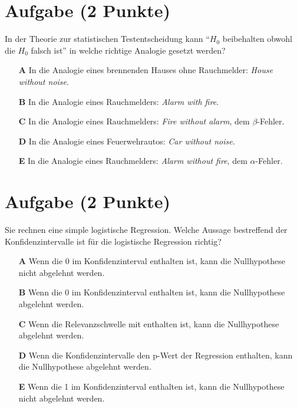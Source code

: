\documentclass[a4paper, 10pt]{scrartcl}\usepackage[]{graphicx}\usepackage[]{xcolor}
\begin{document}
\section{Aufgabe \hfill (2 Punkte)}



In der Theorie zur statistischen Testentscheidung kann "`$H_0$ beibehalten obwohl die $H_0$ falsch ist"'
in welche richtige Analogie gesetzt werden?



\begin{enumerate}
\item [\textbf{A} \msquare] In die Analogie eines brennenden Hauses ohne Rauchmelder: \textit{House without noise}.
\item [\textbf{B} \msquare] In die Analogie eines Rauchmelders: \textit{Alarm with fire}.
\item [\textbf{C} \msquare] In die Analogie eines Rauchmelders: \textit{Fire without alarm}, dem $\beta$-Fehler.
\item [\textbf{D} \msquare] In die Analogie eines Feuerwehrautos: \textit{Car without noise}.
\item [\textbf{E} \msquare] In die Analogie eines Rauchmelders: \textit{Alarm without fire}, dem $\alpha$-Fehler.
\end{enumerate}

\section{Aufgabe \hfill (2 Punkte)}



Sie rechnen eine simple logistische Regression. Welche Aussage bestreffend der
Konfidenzintervalle ist f{\"u}r die logistische Regression richtig?



\begin{enumerate}
\item [\textbf{A} \msquare] Wenn die 0 im Konfidenzinterval enthalten ist, kann die Nullhypothese nicht abgelehnt werden.
\item [\textbf{B} \msquare] Wenn die 0 im Konfidenzinterval enthalten ist, kann die Nullhypothese abgelehnt werden.
\item [\textbf{C} \msquare] Wenn die Relevanzschwelle mit enthalten ist, kann die Nullhypothese abgelehnt werden.
\item [\textbf{D} \msquare] Wenn die Konfidenzintervalle den p-Wert der Regression enthalten, kann die Nullhypothese abgelehnt werden.
\item [\textbf{E} \msquare] Wenn die 1 im Konfidenzinterval enthalten ist, kann die Nullhypothese nicht abgelehnt werden.
\end{enumerate}
\end{document}
